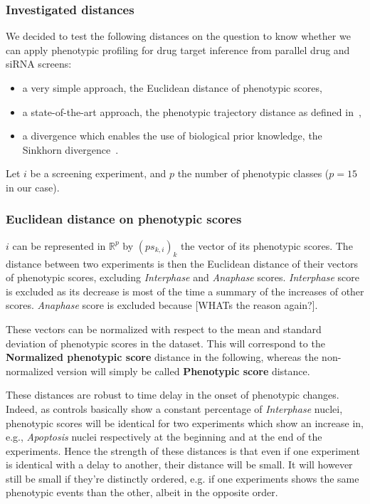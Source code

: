 \subsubsection{Investigated distances}
We decided to test the following distances on the question to know whether we can apply phenotypic profiling for drug target inference from parallel drug and siRNA screens:
\begin{itemize}
\item a very simple approach, the Euclidean distance of phenotypic scores, 
\item a state-of-the-art approach, the phenotypic trajectory distance as defined in~\cite{Walter2010},
\item a divergence which enables the use of biological prior knowledge, the Sinkhorn divergence~\cite{sinkhorn}.
\end{itemize}

Let $i$ be a screening experiment, and $p$ the number of phenotypic classes ($p=15$ in our case). 
\subsubsection*{Euclidean distance on phenotypic scores}
$i$ can be represented in $\mathbb{R}^p$ by $(ps_{k,i})_k$ the vector of its phenotypic scores. The distance between two experiments is then the Euclidean distance of their vectors of phenotypic scores, excluding \textit{Interphase} and \textit{Anaphase} scores. \textit{Interphase} score is excluded as its decrease is most of the time a summary of the increases of other scores. \textit{Anaphase} score is excluded because [WHATs the reason again?]. 

These vectors can be normalized with respect to the mean and standard deviation of phenotypic scores in the dataset. This will correspond to the \textbf{Normalized phenotypic score} distance in the following, whereas the non-normalized version will simply be called \textbf{Phenotypic score} distance.

These distances are robust to time delay in the onset of phenotypic changes. Indeed, as controls basically show a constant percentage of \textit{Interphase} nuclei, phenotypic scores will be identical for two experiments which show an increase in, e.g., \textit{Apoptosis} nuclei respectively at the beginning and at the end of the experiments. Hence the strength of these distances is that even if one experiment is identical with a delay to another, their distance will be small. It will however still be small if they're distinctly ordered, e.g. if one experiments shows the same phenotypic events than the other, albeit in the opposite order.

